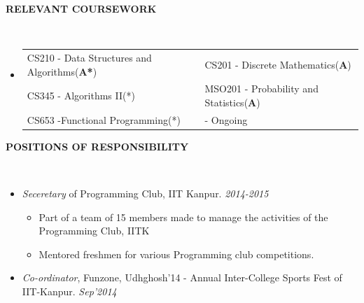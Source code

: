 \documentclass[a4paper,10pt]{article}
\newcommand{\lsep}{-0.5cm}
\newcommand{\resheading}[1]{{\small \colorbox{mygrey}{\begin{minipage}{0.975\textwidth}{\textbf{#1 \vphantom{p\^{E}}}}\end{minipage}}}}
\begin{document}
        \resheading{\textbf{RELEVANT COURSEWORK} }\\[\lsep] \vspace{2mm}
        \begin{itemize}
\item[]
                                        \begin{tabular}{p{69mm}@{\hskip 0.25in} p{80mm}} 
                                          CS210 - Data Structures and Algorithms(\textbf{A*}) & CS201 - Discrete Mathematics(\textbf{A})  \\
                                          CS345 - Algorithms II(*)             & MSO201 - Probability and Statistics(\textbf{A}) \\
                                          CS653 -Functional Programming(*)  & \hfill * - Ongoing
                                        \end{tabular}

        \end{itemize}

\vspace{-1mm}
        \resheading{\textbf{POSITIONS OF RESPONSIBILITY} }\\[\lsep] \vspace{1mm}
                                                   \begin{itemize} \itemsep -2pt
                                                  \item \textit{Seceretary} of Programming Club, IIT Kanpur. \hfill \textit{2014-2015}
                                                    \vspace{-2mm}\begin{itemize}
                                                      \item Part of a team of 15 members made to manage the activities of the Programming Club, IITK
                                                      \item Mentored freshmen for various Programming club competitions.
                                                      \end{itemize}
                                                      \item \textit{Co-ordinator},
                                                        Funzone, Udhghosh'14 -
                                                        Annual Inter-College
                                                        Sports Fest of
                                                        IIT-Kanpur. \hfill \textit{Sep'2014}
                                                    \end{itemize}
      
\end{document}
